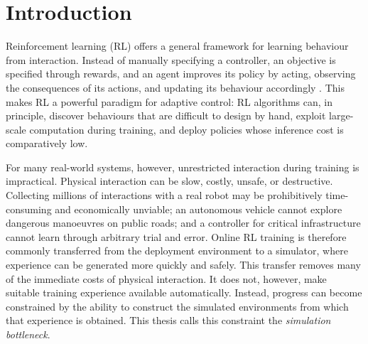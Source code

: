 




\chapter{Introduction}
\label{chap:introduction}


Reinforcement learning (RL) offers a general framework for learning behaviour from interaction. Instead of manually specifying a controller, an objective is specified through rewards, and an agent improves its policy by acting, observing the consequences of its actions, and updating its behaviour accordingly \citep{sutton2018reinforcement}. This makes RL a powerful paradigm for adaptive control: RL algorithms can, in principle, discover behaviours that are difficult to design by hand, exploit large-scale computation during training, and deploy policies whose inference cost is comparatively low.

For many real-world systems, however, unrestricted interaction during training is impractical. Physical interaction can be slow, costly, unsafe, or destructive. Collecting millions of interactions with a real robot may be prohibitively time-consuming and economically unviable; an autonomous vehicle cannot explore dangerous manoeuvres on public roads; and a controller for critical infrastructure cannot learn through arbitrary trial and error. Online RL training is therefore commonly transferred from the deployment environment to a simulator, where experience can be generated more quickly and safely. This transfer removes many of the immediate costs of physical interaction. It does not, however, make suitable training experience available automatically. Instead, progress can become constrained by the ability to construct the simulated environments from which that experience is obtained. This thesis calls this constraint the \emph{simulation bottleneck}.

